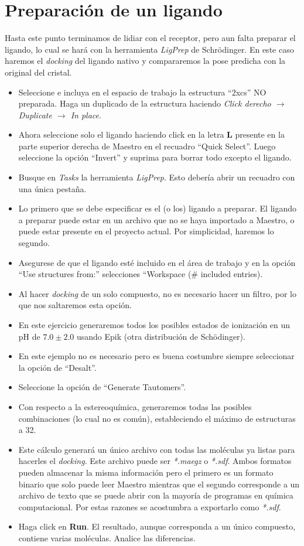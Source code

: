 \documentclass{article}
\begin{document}
\section{Preparación de un ligando}
\label{ligands}
Hasta este punto terminamos de lidiar con el receptor, pero aun falta preparar el ligando, lo cual se hará con la herramienta \emph{LigPrep} de Schr\"odinger. En este caso haremos el \emph{docking} del ligando nativo y compararemos la pose predicha con la original del cristal.
    \begin{itemize}
        \item Seleccione e incluya en el espacio de trabajo la estructura ``2xcs'' NO preparada. Haga un duplicado de la estructura haciendo \emph{Click derecho $\rightarrow$ Duplicate $\rightarrow$ In place}.
        \item Ahora seleccione solo el ligando haciendo click en la letra \textbf{L} presente en la parte superior derecha de Maestro en el recuadro ``Quick Select''. Luego seleccione la opción ``Invert'' y suprima para borrar todo excepto el ligando.
        \item Busque en \emph{Tasks} la herramienta \emph{LigPrep}. Esto debería abrir un recuadro con una única pestaña.
        \item Lo primero que se debe especificar es el (o los) ligando a preparar. El ligando a preparar puede estar en un archivo que no se haya importado a Maestro, o puede estar presente en el proyecto actual. Por simplicidad, haremos lo segundo.
        \item Asegurese de que el ligando esté incluido en el área de trabajo y en la opción ``Use structures from:'' selecciones ``Workspace (\# included entries).
        \item Al hacer \emph{docking} de un solo compuesto, no es necesario hacer un filtro, por lo que nos saltaremos esta opción. 
        \item En este ejercicio generaremos todos los posibles estados de ionización en un pH de $7.0\pm2.0$ usando Epik (otra distribución de Sch\"odinger).
        \item En este ejemplo no es necesario pero es buena costumbre siempre seleccionar la opción de ``Desalt''.
        \item Seleccione la opción de ``Generate Tautomers''.
        \item Con respecto a la estereoquímica, generaremos todas las posibles combinaciones (lo cual no es común), estableciendo el máximo de estructuras a 32.
        \item Este cálculo generará un único archivo con todas las moléculas ya listas para hacerles el \emph{docking}. Este archivo puede ser \emph{*.maegz} o \emph{*.sdf}. Ambos formatos pueden almacenar la misma información pero el primero es un formato binario que solo puede leer Maestro mientras que el segundo corresponde a un archivo de texto que se puede abrir con la mayoría de programas en química computacional. Por estas razones se acostumbra a exportarlo como \emph{*.sdf}.
        \item Haga click en \textbf{Run}. El resultado, aunque corresponda a un único compuesto, contiene varias moléculas. Analice las diferencias.
    \end{itemize}
\end{document}
